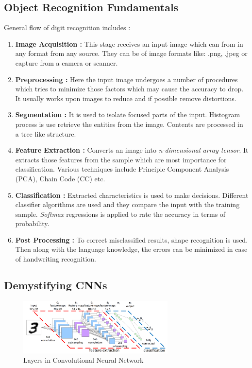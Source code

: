\documentclass[12pt, a4paper]{report}
\begin{document}
\subsection{Object Recognition Fundamentals}
\label{subsec:objrecfund}
General flow of digit recognition includes \cite{art:medium:hdreccnn}:
\begin{enumerate}
    \item \textbf{Image Acquisition :}  This stage receives an input image which can from in any format from any source. They can be of image formats like: .png, .jpeg or capture from a camera or scanner.
    \item \textbf{Preprocessing :} Here the input image undergoes a number of procedures which tries to minimize those factors which may cause the accuracy to drop. It usually works upon images to reduce and if possible remove distortions.
    \item \textbf{Segmentation :} It is used to isolate focused parts of the input. Histogram process is use retrieve the entities from the image. Contents are processed in a tree like structure.
    \item \textbf{Feature Extraction :} Converts an image into \emph{n-dimensional array tensor}. It extracts those features from the sample which are most importance for classification. Various techniques include Principle Component Analysis (PCA), Chain Code (CC) etc.
    \item \textbf{Classification :} Extracted characteristics is used to make decisions. Different classifier algorithms are used and they compare the input with the training sample. \emph{Softmax} regressions is applied to rate the accuracy in terms of probability.
    \item \textbf{Post Processing :} To correct misclassified results, shape recognition is used. Then along with the language knowledge, the errors can be minimized in case of handwriting recognition.
\end{enumerate}

\subsection{Demystifying CNNs}
\label{subsec:layrcnn}

\begin{figure}[!htbp]
    \centering
    \includegraphics[width=0.7\textwidth]{cnn_layers.png}
    \caption[Layers in Convolutional Neural Network]{Layers in Convolutional Neural Network}
    \label{fig:5.3}
\end{figure}
\end{document}
